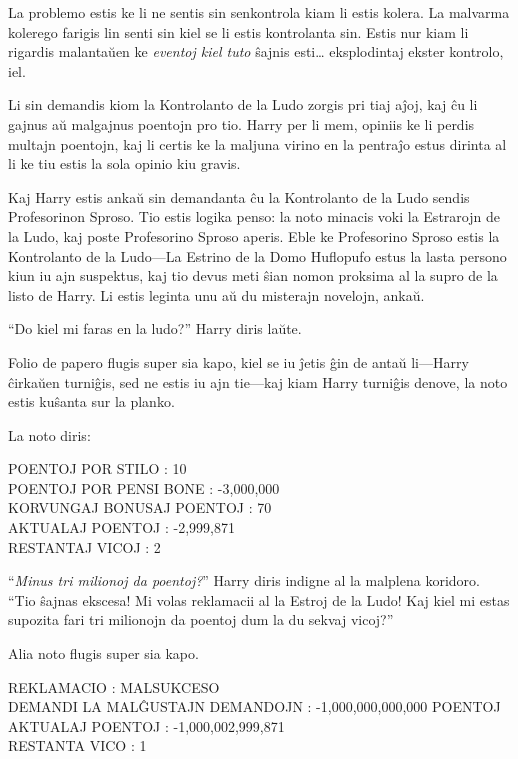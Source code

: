 La problemo estis ke li ne sentis sin senkontrola kiam li estis kolera. La
malvarma kolerego farigis lin senti sin kiel se li estis kontrolanta sin. Estis
nur kiam li rigardis malantaŭen ke \emph{eventoj kiel tuto} ŝajnis esti\ldots
eksplodintaj ekster kontrolo, iel.

Li sin demandis kiom la Kontrolanto de la Ludo zorgis pri tiaj aĵoj, kaj ĉu li
gajnus aŭ malgajnus poentojn pro tio. Harry per li mem, opiniis ke li perdis
multajn poentojn, kaj li certis ke la maljuna virino en la pentraĵo estus dirinta al
li ke tiu estis la sola opinio kiu gravis.

Kaj Harry estis ankaŭ sin demandanta ĉu la Kontrolanto de la Ludo sendis
Profesorinon Sproso. Tio estis logika penso: la noto minacis voki la Estrarojn
de la Ludo, kaj poste Profesorino Sproso aperis. Eble ke Profesorino Sproso
estis la Kontrolanto de la Ludo—La Estrino de la Domo Huflopufo estus la lasta
persono kiun iu ajn suspektus, kaj tio devus meti ŝian nomon proksima al la
supro de la listo de Harry. Li estis leginta unu aŭ du misterajn novelojn,
ankaŭ.

``Do kiel mi faras en la ludo?'' Harry diris laŭte.

Folio de papero flugis super sia kapo, kiel se iu ĵetis ĝin de antaŭ li—Harry
ĉirkaŭen turniĝis, sed ne estis iu ajn tie—kaj kiam Harry turniĝis denove, la
noto estis kuŝanta sur la planko.

La noto diris:

\begin{center}
  POENTOJ POR STILO : 10 \\
  POENTOJ POR PENSI BONE : -3,000,000 \\
  KORVUNGAJ BONUSAJ POENTOJ : 70 \\
  AKTUALAJ POENTOJ : -2,999,871\\
  RESTANTAJ VICOJ : 2\\
\end{center}

``\emph{Minus tri milionoj da poentoj?}'' Harry diris indigne al la
malplena koridoro. ``Tio ŝajnas ekscesa! Mi volas reklamacii al la
Estroj de la Ludo! Kaj kiel mi estas supozita fari tri milionojn da
poentoj dum la du sekvaj vicoj?''

Alia noto flugis super sia kapo.

\begin{center}
  REKLAMACIO : MALSUKCESO \\
  DEMANDI LA MALĜUSTAJN DEMANDOJN : -1,000,000,000,000 POENTOJ\\
  AKTUALAJ POENTOJ : -1,000,002,999,871\\
  RESTANTA VICO : 1
\end{center}

